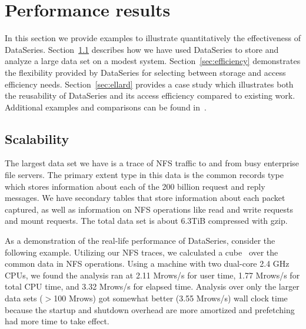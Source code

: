 \documentclass{acm_proc_article-sp}
\begin{document}
\section{Performance results}\label{sec:results}


In this section we provide examples to illustrate quantitatively the 
effectiveness of DataSeries.  
Section~\ref{sec:scale} describes how we have used DataSeries to store 
and analyze a large data set on a modest system.
Section~\ref{sec:efficiency} demonstrates the flexibility provided
by DataSeries for selecting between storage and access efficiency needs.
Section~\ref{sec:ellard} provides a case study which illustrates
both the reusability of DataSeries and its access efficiency compared
to existing work.
Additional examples and comparisons can be found 
in~\cite{DSTechnicalReportSnapshot}.

\subsection{Scalability}\label{sec:scale}

The largest data set we have is a trace of NFS traffic to and from
busy enterprise file servers.
The primary extent type 
in this data is the common records type which stores information about each
of the 200 billion request and reply messages. We have secondary tables that
store information about each packet captured, as well as 
information on NFS operations 
like read and write requests and mount requests.  
The total data set
is about 6.3TiB compressed with gzip.

As a demonstration of the real-life performance of DataSeries,
consider the following example.  Utilizing our NFS traces, we
calculated a cube~\cite{gray97cube} over the common data in NFS
operations.  Using a 
machine with two dual-core 2.4 GHz CPUs,
we found the
analysis ran at 2.11 Mrows/s for user time, 1.77 Mrows/s for total CPU
time, and 3.32 Mrows/s for elapsed time.  Analysis over only the larger
data sets ($>$100 Mrows) got somewhat better (3.55 Mrows/s) wall clock
time because the startup and shutdown overhead are more amortized and
prefetching had more time to take effect.
\end{document}
